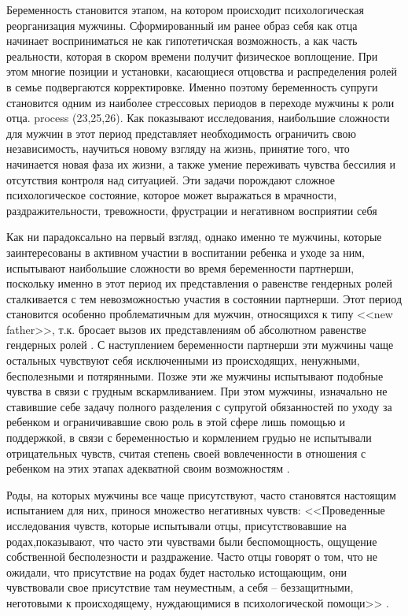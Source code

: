 \documentclass{../../common/thesisbyxetex}
\begin{document}
Беременность становится этапом, на котором происходит психологическая реорганизация мужчины.
Сформированный им ранее образ себя как отца начинает восприниматься не как гипотетичская
возможность, а как часть реальности, которая в скором времени получит физическое воплощение. При
этом многие позиции и установки, касающиеся отцовства и распределения ролей в семье подвергаются
корректировке. Именно поэтому беременность супруги становится одним из наиболее стрессовых периодов
в переходе мужчины к роли отца. process (23,25,26). Как показывают исследования, наибольшие
сложности для мужчин в этот период представляет необходимость ограничить свою независимость,
научиться новому взгляду на жизнь, принятие того, что начинается новая фаза их жизни, а также
умение  переживать чувства бессилия и отсутствия контроля над ситуацией. Эти задачи порождают
сложное  психологическое состояние, которое может выражаться в мрачности, раздражительности,
тревожности, фрустрации и негативном восприятии себя  \cite[314]{flit}


Как ни парадоксально на первый взгляд, однако именно  те мужчины, которые 
заинтересованы в активном участии в воспитании ребенка и уходе за ним,
испытывают наибольшие сложности во время беременности партнерши, поскольку именно в этот период их 
представления  о равенстве гендерных ролей сталкивается с тем невозможностью участия в состоянии 
партнерши.  Этот период становится особенно проблематичным для
мужчин, относящихся к типу <<new father>>, т.к. бросает вызов их представлениям об абсолютном
равенстве гендерных ролей \cite[20]{long}. С наступлением беременности партнерши эти мужчины 
чаще остальных чувствуют себя исключенными из происходящих, ненужными, бесполезными и 
потярянными. Позже эти же мужчины испытывают подобные чувства в связи с грудным вскармливанием. При 
этом мужчины, изначально не ставившие себе задачу полного разделения с супругой обязанностей по 
уходу за ребенком и ограничивавшие свою роль в этой сфере лишь помощью и поддержкой, в связи с 
беременностью и кормлением грудью не испытывали отрицательных чувств, считая степень 
своей вовлеченности в отношения с ребенком на этих этапах адекватной своим возможностям 
 \cite[21]{long}.

Роды, на которых мужчины все чаще присутствуют, часто становятся  настоящим испытанием
для них, принося множество негативных чувств: <<Проведенные исследования чувств, которые
испытывали отцы, присутствовавшие на родах,показывают, что часто эти чувствами были
беспомощность, ощущение собственной бесполезности и раздражение. Часто отцы говорят о том,
что не ожидали, что присутствие на родах будет настолько истощающим, они чувствовали свое
присутствие там неуместным, а себя -- беззащитными, неготовыми к происходящему, нуждающимися в
психологической помощи>> \cite[313]{flit}.
\end{document}
